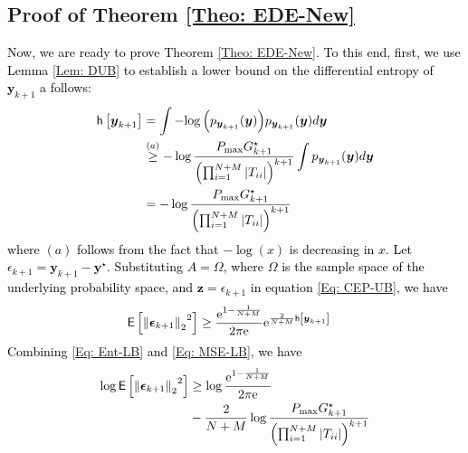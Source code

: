 \documentclass[10pt,twocolumn,twoside]{IEEEtran}
\begin{document}
\subsection{Proof of Theorem \ref{Theo: EDE-New}}\label{Sub-sec: Proof}
\textcolor{black}{Now, we are ready to prove Theorem \ref{Theo: EDE-New}. To this end, first, we use Lemma \ref{Lem: DUB}  to establish a lower bound on the differential entropy of ${\ensuremath{\boldsymbol{{y}}}}_{k+1}$ a follows:
\begin{align}\label{Eq: Ent-LB}
{\ensuremath{\mathsf{h}\left[{{\ensuremath{\boldsymbol{{y}}}}_{k+1}} \right]}}
&=\int -{\ensuremath{\log{\left({{ p_{{\ensuremath{\boldsymbol{{y}}}}_{k+1}}{\left({{\ensuremath{\boldsymbol{{y}}}}}\right)}}}\right)}}}p_{{\ensuremath{\boldsymbol{{y}}}}_{k+1}}{\left({{\ensuremath{\boldsymbol{{y}}}}}\right)}d{\ensuremath{\boldsymbol{{y}}}}\nonumber\\
&\stackrel{(a)}{\geq} -\log{ \frac{P_{\rm max}G_{k+1}^\star}{{\left({\prod_{i=1}^{N+M}{\left|{T_{ii}}\right|}}\right)}^{k+1}}} \int p_{{\ensuremath{\boldsymbol{{y}}}}_{k+1}}{\left({{\ensuremath{\boldsymbol{{y}}}}}\right)}d{\ensuremath{\boldsymbol{{y}}}}\nonumber\\
&= -\log{ \frac{P_{\rm max}G_{k+1}^\star}{{\left({\prod_{i=1}^{N+M}{\left|{T_{ii}}\right|}}\right)}^{k+1}}} 
\end{align}
where $(a)$ follows from the fact that $-{\ensuremath{\log{\left({{x}}\right)}}}$ is decreasing in $x$. Let $\epsilon_{k+1}={\ensuremath{\boldsymbol{{y}}}}_{k+1}-{\ensuremath{\boldsymbol{{y}}}}^\star$. Substituting $A=\Omega$, where $\Omega$ is the sample space of the underlying probability space, and ${\ensuremath{\boldsymbol{{z}}}}=\epsilon_{k+1}$ in equation \eqref{Eq: CEP-UB}, we have  
\begin{align}\label{Eq: MSE-LB}
{\ensuremath{\mathsf{E}\left[{{\left\Vert{{\ensuremath{\boldsymbol{{\epsilon}}}}_{k+1}}\right\Vert_{{2}}}^2} \right]}}
&\geq  \frac{{\ensuremath{{\rm e}^{{1-\frac{1}{N+M}}}}}}{{2\pi {\ensuremath{{\rm e}^{{}}}}}}{\ensuremath{{\rm e}^{{\frac{2}{N+M}{\ensuremath{\mathsf{h}\left[{{\ensuremath{\boldsymbol{{y}}}}_{k+1}} \right]}}}}}}
\end{align}
Combining \eqref{Eq: Ent-LB} and \eqref{Eq: MSE-LB}, we have 
\begin{align}\label{Eq: EXP-LB-A3}
\log{{\ensuremath{\mathsf{E}\left[{{\left\Vert{{\ensuremath{\boldsymbol{{\epsilon}}}}_{k+1}}\right\Vert_{{2}}}^2} \right]}}}&\geq \log{\frac{{\ensuremath{{\rm e}^{{1-\frac{1}{N+M}}}}}}{{2\pi {\ensuremath{{\rm e}^{{}}}}}}}\nonumber\\
&-\frac{2}{N+M}\log{ \frac{P_{\rm max}G_{k+1}^\star}{{\left({\prod_{i=1}^{N+M}{\left|{T_{ii}}\right|}}\right)}^{k+1}}} 
\end{align}}
\end{document}
